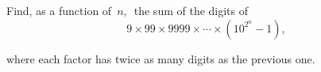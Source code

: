 Find, as a function of $\, n, \,$ the sum of the digits of\[ 9 \times 99 \times 9999 \times \cdots \times \left( 10^{2^n} - 1 \right),  \]

where each factor has twice as many digits as the previous one.